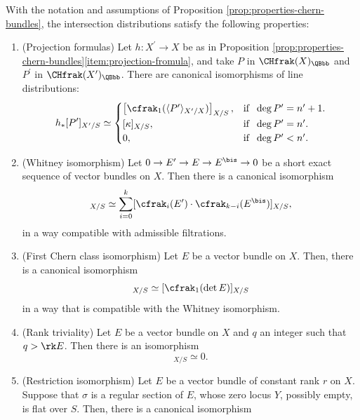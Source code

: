 \begin{corollary}\label{cor:properties-intersection-distribution}
With the notation and assumptions of Proposition \ref{prop:properties-chern-bundles}, the intersection distributions satisfy the following properties:
\begin{enumerate}
\item (Projection formulas) Let $h\colon X^{\prime}\to X$ be as in Proposition \ref{prop:properties-chern-bundles}\eqref{item:projection-fromula}, and take $P$ in $\CHfrak(X)_{\QBbb}$ and $P^{\prime}$ in $\CHfrak(X^{\prime})_{\QBbb}$. There are canonical isomorphisms of line distributions:
\begin{displaymath}
h_\ast [P']_{X^{\prime}/S} \simeq
\begin{cases}
\left[ \cfrak_1 (\langle P^{\prime} \rangle_{X^{\prime}/X})\right]_{X/S}, & \text{if }\; \deg P^{\prime}=n^{\prime}+1.\\
[ \kappa ]_{X/S}, & \text{if }\; \deg P^{\prime} = n^{\prime}. \\
0, & \text{if }\; \deg P^{\prime} < n^{\prime}.
\end{cases}
\end{displaymath}
\item\label{item:prop-int-dist-whitney} (Whitney isomorphism) Let $0 \to E^{\prime}\to E \to E^{\bis} \to 0$ be a short exact sequence of vector bundles on $X$. Then there is a canonical isomorphism
\begin{displaymath}
[\cfrak_{k}(E)]_{X/S}\simeq \sum_{i=0}^{k} [\cfrak_{i}(E^{\prime})\cdot\cfrak_{k-i}(E^{\bis})]_{X/S},
\end{displaymath}
in a way compatible with admissible filtrations.
\item\label{item:prop-int-dist-c1-det} (First Chern class isomorphism) Let $E$ be a vector bundle on $X$. Then, there is a canonical isomorphism
\begin{displaymath}
[\cfrak_1(E)]_{X/S} \simeq [\cfrak_1(\det E)]_{X/S}
\end{displaymath}
in a way that is compatible with the Whitney isomorphism.
\item\label{item:prop-int-dist-rank} (Rank triviality) Let $E$ be a vector bundle on $X$ and $q$ an integer such that $q > \rk E$. Then there is an isomorphism
\begin{displaymath}
[ \cfrak_q(E)]_{X/S} \simeq 0.
\end{displaymath}
\item\label{item:prop-int-dist-restriction} (Restriction isomorphism) Let $E$ be a vector bundle of constant rank $r$ on $X$. Suppose that $\sigma$ is a regular section of $E$, whose zero locus $Y$, possibly empty, is flat over $S$. Then, there is a canonical isomorphism

\end{enumerate}
\end{corollary}
